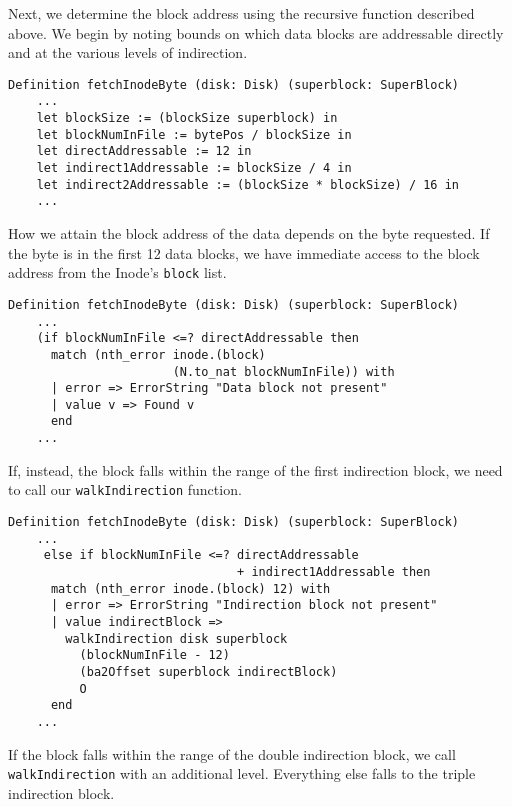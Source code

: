 \documentclass[nocopyrightspace]{sigplanconf}
\begin{document}
Next, we determine the block address using the recursive function described
above. We begin by noting bounds on which data blocks are addressable directly
and at the various levels of indirection.

\begin{lstlisting}
Definition fetchInodeByte (disk: Disk) (superblock: SuperBlock)
    ...
    let blockSize := (blockSize superblock) in
    let blockNumInFile := bytePos / blockSize in
    let directAddressable := 12 in
    let indirect1Addressable := blockSize / 4 in
    let indirect2Addressable := (blockSize * blockSize) / 16 in
    ...
\end{lstlisting}

How we attain the block address of the data depends on the byte requested. If
the byte is in the first 12 data blocks, we have immediate access to the block
address from the Inode's {\tt block} list.

\begin{lstlisting}
Definition fetchInodeByte (disk: Disk) (superblock: SuperBlock)
    ...
    (if blockNumInFile <=? directAddressable then
      match (nth_error inode.(block) 
                       (N.to_nat blockNumInFile)) with
      | error => ErrorString "Data block not present"
      | value v => Found v
      end
    ...
\end{lstlisting}

If, instead, the block falls within the range of the first indirection block,
we need to call our {\tt walkIndirection} function.

\begin{lstlisting}
Definition fetchInodeByte (disk: Disk) (superblock: SuperBlock)
    ...
     else if blockNumInFile <=? directAddressable
                                + indirect1Addressable then
      match (nth_error inode.(block) 12) with
      | error => ErrorString "Indirection block not present"
      | value indirectBlock => 
        walkIndirection disk superblock 
          (blockNumInFile - 12)
          (ba2Offset superblock indirectBlock) 
          O
      end
    ...
\end{lstlisting}

If the block falls within the range of the double indirection block, we call
{\tt walkIndirection} with an additional level. Everything else falls to the
triple indirection block.
\end{document}
